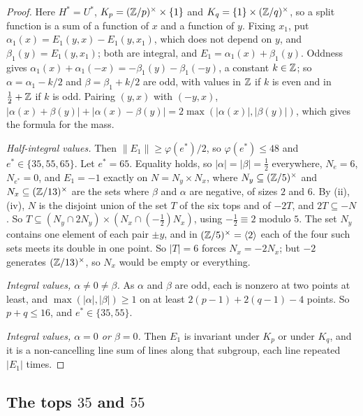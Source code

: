 \begin{proof}
Here $H^{*}=U^{*}$, $K_{p}=(\mathbb{Z}/p)^{\times}\times\{1\}$ and
$K_{q}=\{1\}\times(\mathbb{Z}/q)^{\times}$, so a split function is a sum of a
function of $x$ and a function of $y$. Fixing $x_{1}$, put
$\alpha_{1}(x)=E_{1}(y,x)-E_{1}(y,x_{1})$, which does not depend on $y$, and
$\beta_{1}(y)=E_{1}(y,x_{1})$; both are integral, and $E_{1}=\alpha_{1}(x)+
\beta_{1}(y)$. Oddness gives $\alpha_{1}(x)+\alpha_{1}(-x)=-\beta_{1}(y)-
\beta_{1}(-y)$, a constant $k\in\mathbb{Z}$; so $\alpha=\alpha_{1}-k/2$ and
$\beta=\beta_{1}+k/2$ are odd, with values in $\mathbb{Z}$ if $k$ is even and in
$\frac12+\mathbb{Z}$ if $k$ is odd. Pairing $(y,x)$ with $(-y,x)$,
$|\alpha(x)+\beta(y)|+|\alpha(x)-\beta(y)|=2\max(|\alpha(x)|,|\beta(y)|)$,
which gives the formula for the mass.

\emph{Half-integral values.} Then $\|E_{1}\|\ge\varphi(e^{*})/2$, so
$\varphi(e^{*})\le48$ and $e^{*}\in\{35,55,65\}$. Let $e^{*}=65$. Equality
holds, so $|\alpha|=|\beta|=\frac12$ everywhere, $N_{e}=6$, $N_{e^{*}}=0$, and
$E_{1}=-1$ exactly on $N=N_{y}\times N_{x}$, where $N_{y}\subseteq
(\mathbb{Z}/5)^{\times}$ and $N_{x}\subseteq(\mathbb{Z}/13)^{\times}$ are the sets where
$\beta$ and $\alpha$ are negative, of sizes $2$ and $6$. By
(ii),(iv), $N$ is the disjoint union of the set $T$ of the six
tops and of $-2T$, and $2T\subseteq-N$. So
$T\subseteq(N_{y}\cap2N_{y})\times(N_{x}\cap(-\tfrac12)N_{x})$, using
$-\frac12\equiv2$ modulo $5$. The set $N_{y}$ contains one element of each
pair $\pm y$, and in $(\mathbb{Z}/5)^{\times}=\langle2\rangle$ each of the four such
sets meets its double in one point. So $|T|=6$ forces
$N_{x}=-2N_{x}$; but $-2$ generates $(\mathbb{Z}/13)^{\times}$, so $N_{x}$ would be
empty or everything.

\emph{Integral values, $\alpha\ne0\ne\beta$.} As $\alpha$ and $\beta$ are odd,
each is nonzero at two points at least, and $\max(|\alpha|,|\beta|)\ge1$ on at
least $2(p-1)+2(q-1)-4$ points. So $p+q\le16$, and $e^{*}\in\{35,55\}$.

\emph{Integral values, $\alpha=0$ or $\beta=0$.} Then $E_{1}$ is invariant
under $K_{p}$ or under $K_{q}$, and it is a non-cancelling line sum of lines
along that subgroup, each line repeated $|E_{1}|$ times.
\end{proof}

\subsection{The tops \texorpdfstring{$35$}{35} and \texorpdfstring{$55$}{55}}

